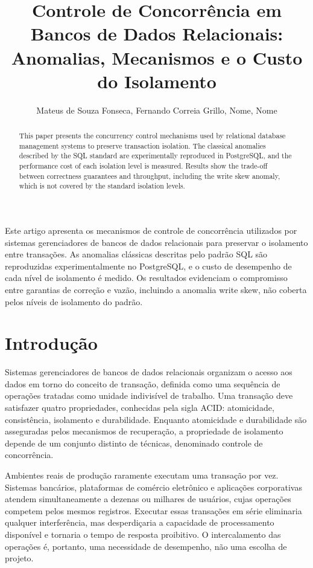 \documentclass[12pt]{article}
\title{Controle de Concorrência em Bancos de Dados Relacionais:\\ Anomalias, Mecanismos e o Custo do Isolamento}
\author{Mateus de Souza Fonseca\inst{1}, Fernando Correia Grillo\inst{1}, Nome\inst{1}, Nome\inst{1}}
\begin{document}
 

\maketitle

\begin{abstract}
  This paper presents the concurrency control mechanisms used by relational
  database management systems to preserve transaction isolation. The classical
  anomalies described by the SQL standard are experimentally reproduced in
  PostgreSQL, and the performance cost of each isolation level is measured.
  Results show the trade-off between correctness guarantees and throughput,
  including the write skew anomaly, which is not covered by the standard
  isolation levels.
\end{abstract}
     
\begin{resumo} 
  Este artigo apresenta os mecanismos de controle de concorrência utilizados
  por sistemas gerenciadores de bancos de dados relacionais para preservar o
  isolamento entre transações. As anomalias clássicas descritas pelo padrão SQL
  são reproduzidas experimentalmente no PostgreSQL, e o custo de desempenho de
  cada nível de isolamento é medido. Os resultados evidenciam o compromisso
  entre garantias de correção e vazão, incluindo a anomalia write skew, não
  coberta pelos níveis de isolamento do padrão.
\end{resumo}

\section{Introdução}
 
Sistemas gerenciadores de bancos de dados relacionais organizam o acesso aos
dados em torno do conceito de transação, definida como uma sequência de
operações tratadas como unidade indivisível de trabalho. 
Uma transação deve satisfazer quatro propriedades,
conhecidas pela sigla ACID: atomicidade, consistência, isolamento e
durabilidade. Enquanto atomicidade e durabilidade são asseguradas pelos
mecanismos de recuperação, a propriedade de isolamento depende de um conjunto
distinto de técnicas, denominado controle de concorrência.
 
Ambientes reais de produção raramente executam uma transação por vez. Sistemas
bancários, plataformas de comércio eletrônico e aplicações corporativas atendem
simultaneamente a dezenas ou milhares de usuários, cujas operações competem
pelos mesmos registros. Executar essas transações em série eliminaria qualquer
interferência, mas desperdiçaria a capacidade de processamento disponível e
tornaria o tempo de resposta proibitivo. O intercalamento das operações é,
portanto, uma necessidade de desempenho, não uma escolha de projeto.
 
\end{document}
